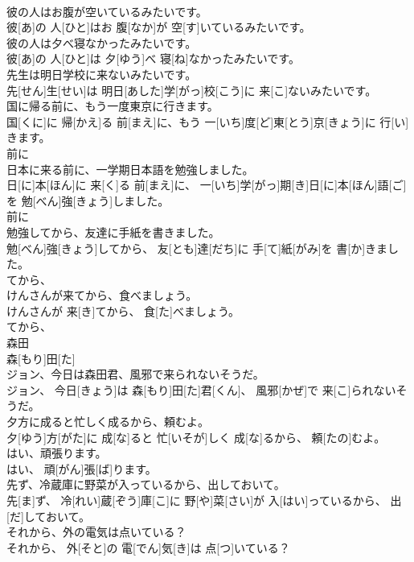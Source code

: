 \documentclass[8pt]{extreport}
\begin{document}
\begin{CJK}{UTF8}{min}
\\	彼の人はお腹が空いているみたいです。	
\\	彼[あ]の 人[ひと]はお 腹[なか]が 空[す]いているみたいです。
\\	彼の人は夕べ寝なかったみたいです。	
\\	彼[あ]の 人[ひと]は 夕[ゆう]べ 寝[ね]なかったみたいです。
\\	先生は明日学校に来ないみたいです。	
\\	先[せん]生[せい]は 明日[あした]学[がっ]校[こう]に 来[こ]ないみたいです。
\\	国に帰る前に、もう一度東京に行きます。	
\\	国[くに]に 帰[かえ]る 前[まえ]に、もう 一[いち]度[ど]東[とう]京[きょう]に 行[い]きます。 
\\	前に 
\\	日本に来る前に、一学期日本語を勉強しました。	
\\	日[に]本[ほん]に 来[く]る 前[まえ]に、 一[いち]学[がっ]期[き]日[に]本[ほん]語[ご]を 勉[べん]強[きょう]しました。 
\\	前に 
\\	勉強してから、友達に手紙を書きました。	
\\	勉[べん]強[きょう]してから、 友[とも]達[だち]に 手[て]紙[がみ]を 書[か]きました。 
\\	てから、 
\\	けんさんが来てから、食べましょう。	
\\	けんさんが 来[き]てから、 食[た]べましょう。 
\\	てから、 
\\	森田	
\\	森[もり]田[た]	
\\	ジョン、今日は森田君、風邪で来られないそうだ。	
\\	ジョン、 今日[きょう]は 森[もり]田[た]君[くん]、 風邪[かぜ]で 来[こ]られないそうだ。
\\	夕方に成ると忙しく成るから、頼むよ。	
\\	夕[ゆう]方[がた]に 成[な]ると 忙[いそが]しく 成[な]るから、 頼[たの]むよ。
\\	はい、頑張ります。	
\\	はい、 頑[がん]張[ば]ります。
\\	先ず、冷蔵庫に野菜が入っているから、出しておいて。	
\\	先[ま]ず、 冷[れい]蔵[ぞう]庫[こ]に 野[や]菜[さい]が 入[はい]っているから、 出[だ]しておいて。
\\	それから、外の電気は点いている？	
\\	それから、 外[そと]の 電[でん]気[き]は 点[つ]いている？

\end{CJK}
\end{document}
